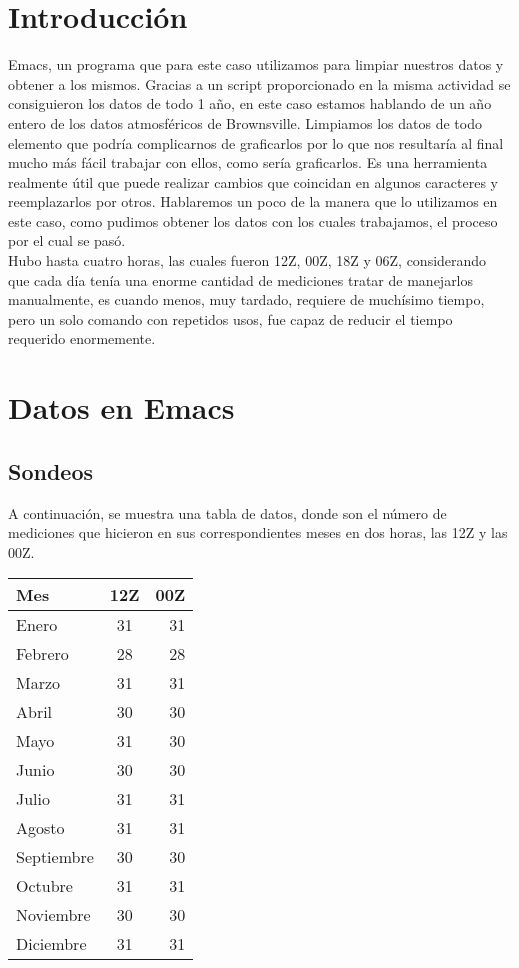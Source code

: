 \documentclass[a4paper,12pt]{article}
\begin{document}
\section{Introducción}
\noindent
Emacs, un programa que para este caso utilizamos para limpiar nuestros datos y obtener a los mismos. Gracias a un script proporcionado en la misma actividad se consiguieron los datos de todo 1 año, en este caso estamos hablando de un año entero de los datos atmosféricos de Brownsville. Limpiamos los datos de todo elemento que podría complicarnos de graficarlos por lo que nos resultaría al final mucho más fácil trabajar con ellos, como sería graficarlos. Es una herramienta realmente útil que puede realizar cambios que coincidan en algunos caracteres y reemplazarlos por otros. Hablaremos un poco de la manera que lo utilizamos en este caso, como pudimos obtener los datos con los cuales trabajamos, el proceso por el cual se pasó.\\

Hubo hasta cuatro horas, las cuales fueron 12Z, 00Z, 18Z y 06Z, considerando que cada día tenía una enorme cantidad de mediciones tratar de manejarlos manualmente, es cuando menos, muy tardado, requiere de muchísimo tiempo, pero un solo comando con repetidos usos, fue capaz de reducir el tiempo requerido enormemente.
\newpage
\section{Datos en Emacs}

\subsection{Sondeos}
\noindent
A continuación, se muestra una tabla de datos, donde son el número de mediciones que hicieron en sus correspondientes meses en dos horas, las 12Z y las 00Z.

\begin{center}
\begin{tabular}{| l | c | r |}
\hline
Mes & 12Z & 00Z \\ \hline
Enero & 31 & 31 \\ \hline 
Febrero & 28 & 28 \\ \hline
Marzo & 31 & 31 \\ \hline
Abril & 30 & 30 \\ \hline
Mayo & 31 & 30 \\ \hline
Junio & 30 & 30 \\ \hline
Julio & 31 & 31 \\ \hline
Agosto & 31 & 31 \\ \hline 
Septiembre & 30 & 30\\ \hline 
Octubre & 31 & 31 \\ \hline
Noviembre & 30 & 30 \\ \hline
Diciembre & 31 & 31 \\ \hline

\hline
\end{tabular}
\end{center}
\end{document}
